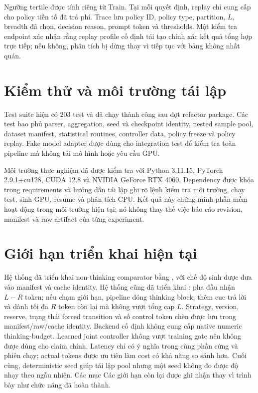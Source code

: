 Ngưỡng tertile được tính riêng từ Train. Tại mỗi quyết định, replay chỉ cung cấp cho
policy tiền tố đã trả phí. Trace lưu policy ID, policy type, partition, $L$, breadth đã
chọn, decision reason, prompt token và thresholds. Một kiểm tra endpoint xác nhận rằng
replay profile cố định tái tạo chính xác kết quả tổng hợp trực tiếp; nếu không, phân
tích bị dừng thay vì tiếp tục với bảng không nhất quán.

\section{Kiểm thử và môi trường tái lập}

Test suite hiện có 203 test và đã chạy thành công sau đợt refactor package. Các test
bao phủ parser, aggregation, seed và checkpoint identity, nested sample pool, dataset
manifest, statistical routines, controller data, policy freeze và policy replay. Fake
model adapter được dùng cho integration test để kiểm tra toàn pipeline mà không tải
mô hình hoặc yêu cầu GPU.

Môi trường thực nghiệm đã được kiểm tra với Python 3.11.15, PyTorch 2.9.1+cu128, CUDA
12.8 và NVIDIA GeForce RTX 4060. Dependency được khóa trong requirements và hướng dẫn
tái lập ghi rõ lệnh kiểm tra môi trường, chạy test, sinh GPU, resume và phân tích CPU.
Kết quả này chứng minh phần mềm hoạt động trong môi trường hiện tại; nó không thay thế
việc báo cáo revision, manifest và raw artifact của từng experiment.

\section{Giới hạn triển khai hiện tại}

Hệ thống đã triển khai non-thinking comparator bằng
, với chế độ sinh được đưa vào manifest và cache identity.
Hệ thống cũng đã triển khai : pha đầu nhận $L-R$ token;
nếu chạm giới hạn, pipeline đóng thinking block, thêm cue trả lời và dành tối đa
$R$ token còn lại mà không vượt tổng cap $L$. Strategy, version, reserve, trạng thái
forced transition và số control token chèn được lưu trong manifest/raw/cache identity.
Backend cố định không cung cấp native numeric thinking-budget. Learned joint
controller không vượt training gate nên không được dùng cho claim chính. Latency chỉ
có ý nghĩa trong cùng phần cứng và phiên chạy;
actual tokens được ưu tiên làm cost có khả năng so sánh hơn. Cuối cùng, deterministic
seed giúp tái lập pool nhưng một seed không đo được độ nhạy theo ngẫu nhiên. Các mục
Các giới hạn còn lại được ghi nhận thay vì trình bày như chức năng đã hoàn thành.
